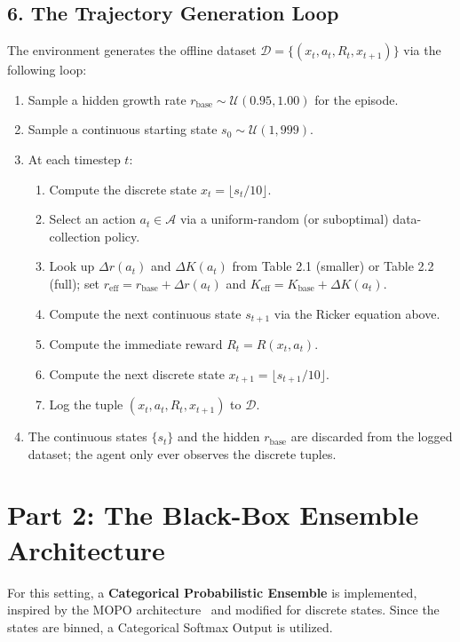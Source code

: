 \documentclass[11pt]{article}
\begin{document}
\subsection*{6. The Trajectory Generation Loop}
The environment generates the offline dataset $\mathcal{D} = \{(x_t, a_t, R_t, x_{t+1})\}$ via the following loop:
\begin{enumerate}
    \item Sample a hidden growth rate $r_{\mathrm{base}} \sim \mathcal{U}(0.95, 1.00)$ for the episode.
    \item Sample a continuous starting state $s_0 \sim \mathcal{U}(1, 999)$.
    \item At each timestep $t$:
    \begin{enumerate}
        \item Compute the discrete state $x_t = \lfloor s_t / 10 \rfloor$.
        \item Select an action $a_t \in \mathcal{A}$ via a uniform-random (or suboptimal) data-collection policy.
        \item Look up $\Delta r(a_t)$ and $\Delta K(a_t)$ from Table 2.1 (smaller) or Table 2.2 (full); set $r_{\mathrm{eff}} = r_{\mathrm{base}} + \Delta r(a_t)$ and $K_{\mathrm{eff}} = K_{\mathrm{base}} + \Delta K(a_t)$.
        \item Compute the next continuous state $s_{t+1}$ via the Ricker equation above.
        \item Compute the immediate reward $R_t = R(x_t, a_t)$.
        \item Compute the next discrete state $x_{t+1} = \lfloor s_{t+1} / 10 \rfloor$.
        \item Log the tuple $(x_t, a_t, R_t, x_{t+1})$ to $\mathcal{D}$.
    \end{enumerate}
    \item The continuous states $\{s_t\}$ and the hidden $r_{\mathrm{base}}$ are discarded from the logged dataset; the agent only ever observes the discrete tuples.
\end{enumerate}

\newpage

\section*{Part 2: The Black-Box Ensemble Architecture}
For this setting, a \textbf{Categorical Probabilistic Ensemble} is implemented, inspired by the MOPO architecture~\cite{yu2020mopo} and modified for discrete states. Since the states are binned, a Categorical Softmax Output is utilized.
\end{document}
